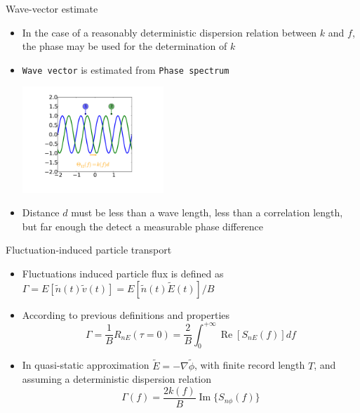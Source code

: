 \documentclass[t,10pt]{beamer}
\renewcommand\Re{\operatorname{Re}}
\renewcommand\Im{\operatorname{Im}}
\begin{document}
\begin{frame}{Wave-vector estimate}
\begin{itemize}[<+->]
\item In the case of a reasonably deterministic dispersion relation between $k$ and $f$, the phase may be
  used for the determination of $k$
\item\textcolor{ta3chameleon}{\texttt{Wave vector}} is
  estimated from \textcolor{ta3chameleon}{\texttt{Phase spectrum}}
\begin{center}
\includegraphics[height=4cm]{phase-shift}
\end{center}
\item \textcolor{tachameleon}{Distance $d$ must be less than
  a wave length, less than a correlation length, but far enough the
  detect a measurable phase difference}
\end{itemize}
\end{frame}

\begin{frame}{Fluctuation-induced particle transport}
\begin{itemize}
\item Fluctuations induced particle flux is defined as $\Gamma = E[\tilde{n}(t)\tilde{v}(t)]=E[\tilde{n}(t)\tilde{E}(t)]/B$
\item According to previous definitions and properties 
\begin{equation*}
\Gamma
=\frac{1}{B}R_{nE}(\tau=0)= \frac{2}{B}\int_0^{+\infty}\Re[S_{nE}(f)]df
\end{equation*}
\item In quasi-static approximation $\tilde{E}=-\nabla\tilde{\phi}$,
  with finite record length $T$, and assuming a deterministic
  dispersion relation 
\begin{equation*}
\Gamma(f)=\frac{2k(f)}{B}\Im\{S_{n\phi}(f)\} 
\end{equation*}
\end{itemize}
\end{frame}
\end{document}

